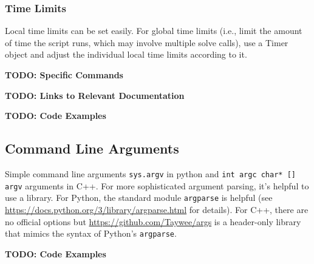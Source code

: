 \documentclass[12pt]{article}
\newcommand\red[1]{{\color{red}#1}}
\begin{document}
\subsubsection{Time Limits}
Local time limits can be set easily. For global time limits (i.e., limit the amount of time the script runs, which may involve multiple solve calls), use a Timer object and adjust the individual local time limits according to it.

\red{\textbf{TODO: Specific Commands}}

\red{\textbf{TODO: Links to Relevant Documentation}}

\red{\textbf{TODO: Code Examples}}

\subsection{Command Line Arguments}
Simple command line arguments \texttt{sys.argv} in python and \texttt{int argc char* [] argv} arguments in C++. For more sophisticated argument parsing, it's helpful to use a library. For Python, the standard module \texttt{argparse} is helpful (see \url{https://docs.python.org/3/library/argparse.html} for details). For C++, there are no official options but \url{https://github.com/Taywee/args} is a header-only library that mimics the syntax of Python's \texttt{argparse}.

\red{\textbf{TODO: Code Examples}}

\end{document}
